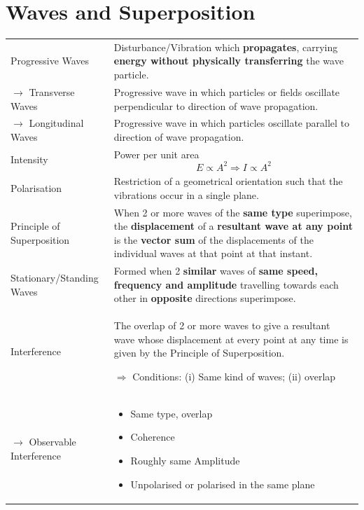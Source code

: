 \documentclass[a4paper,11pt]{article}
\begin{document}
	\section{Waves and Superposition}
	\begin{center}
		\renewcommand{\arraystretch}{1.5}
		\begin{tabular}{@{} l p{10cm} @{}}
			\toprule
			Progressive Waves & Disturbance/Vibration which \textbf{propagates}, carrying \textbf{energy without physically transferring} the wave particle. \\
			$\rightarrow$ Transverse Waves & Progressive wave in which particles or fields oscillate perpendicular to direction of wave propagation. \\ 
			$\rightarrow$ Longitudinal Waves & Progressive wave in which particles oscillate parallel to direction of wave propagation. \\
			Intensity & Power per unit area $$E \propto A^2 \Rightarrow I \propto A^2$$ \vspace*{-\baselineskip}\\
			Polarisation & Restriction of a geometrical orientation such that the vibrations occur in a single plane. \\ 
			Principle of Superposition & When 2 or more waves of the \textbf{same type} superimpose, the \textbf{displacement} of a \textbf{resultant wave at any point} is the \textbf{vector sum} of the displacements of the individual waves at that point at that instant.\\
			Stationary/Standing Waves & Formed when 2 \textbf{similar} waves of \textbf{same speed, frequency and amplitude} travelling towards each other in \textbf{opposite} directions superimpose. \\
			Interference & The overlap of 2 or more waves to give a resultant wave whose displacement at every point at any time is given by the Principle of Superposition. \par $\Rightarrow$ Conditions: (i) Same kind of waves; (ii) overlap\\
			$\rightarrow$ Observable Interference & 
			\begin{minipage}[t]{\textwidth}%
				\begin{itemize}
					\item Same type, overlap
					\item Coherence 
					\item Roughly same Amplitude 
					\item Unpolarised or polarised in the same plane 
				\end{itemize}

\end{minipage}
\end{tabular}
\end{center}
\end{document}
